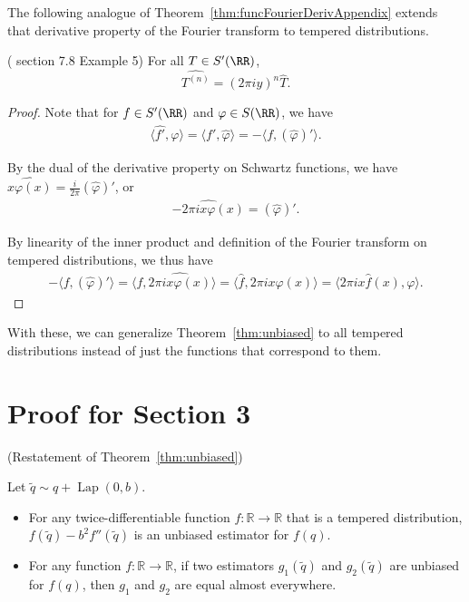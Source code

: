 \documentclass[11pt]{article}
\newcommand{\Lap}{\operatorname{Lap}}
\newcommand{\R}{\mathbb{R}}
\begin{document}
The following analogue of Theorem~\ref{thm:funcFourierDerivAppendix} extends that derivative property of the Fourier transform to tempered distributions.

\begin{corollary}
\label{cor:derivative} (\cite{vanDijk+2013} section 7.8 Example 5)
For all $T \in S'(\RR)$,
    $$\widehat{T^{(n)}} = (2\pi i y)^n \hat{T}.$$
\end{corollary}

\begin{proof}
Note that for $f \in S'(\RR)$ and $\varphi \in S(\RR)$, we have
\begin{align}
    \langle \hat{f'}, \varphi\rangle = \langle f', \hat{\varphi}\rangle = -\langle f, \left(\hat{\varphi}\right)'\rangle.
\end{align}

By the dual of the derivative property on Schwartz functions, we have $\widehat{x \varphi(x)} = \frac{i}{2\pi}\left(\hat{\varphi}\right)'$, or
\begin{align}
    \widehat{-2\pi i x \varphi(x)} = \left(\hat{\varphi}\right)'.
\end{align}

By linearity of the inner product and definition of the Fourier transform on tempered distributions, we thus have
\begin{align}
    -\langle f, \left(\hat{\varphi}\right)'\rangle = \langle f, \widehat{2\pi ix \varphi(x)}\rangle = \langle \hat{f}, 2\pi i x \varphi(x)\rangle = \langle 2\pi i x \hat{f}(x), \varphi \rangle.
\end{align}

\end{proof}

With these, we can generalize Theorem~\ref{thm:unbiased} to all tempered distributions instead of just the functions that correspond to them.


\section{Proof for Section 3} \label{App: section3}
\begin{theorem}
(Restatement of Theorem~\ref{thm:unbiased})
    \item Let $\tilde{q} \sim q + \Lap(0,b)$. 
    \begin{itemize}
         \item For any twice-differentiable function $f:\R \to \R$ that is a tempered distribution, $f(\tilde{q}) - b^2 f''(\tilde{q})$ is an unbiased estimator for $f(q)$.
        \item For any function $f:\R \to \R$, if two estimators $g_1(\tilde{q})$ and $g_2(\tilde{q})$ are unbiased for $f(q)$, then $g_1$ and $g_2$ are equal almost everywhere.
    \end{itemize}
\end{theorem}
\end{document}

